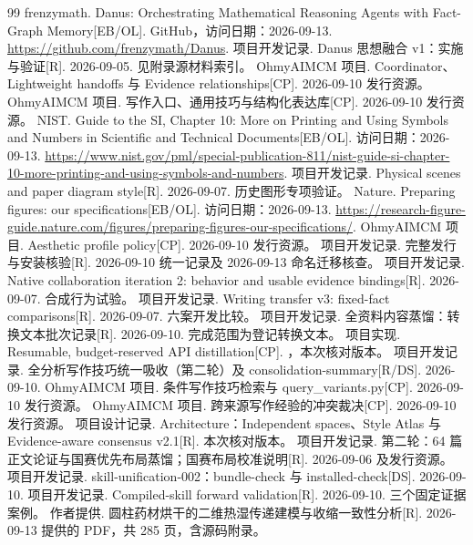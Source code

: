 \documentclass[UTF8,a4paper,zihao=-4,fontset=fandol]{ctexart}
\begin{document}
\begin{thebibliography}{99}\small
{} frenzymath. Danus: Orchestrating Mathematical Reasoning Agents with Fact-Graph Memory[EB/OL]. GitHub，访问日期：2026-09-13. \url{https://github.com/frenzymath/Danus}.
 项目开发记录. Danus 思想融合 v1：实施与验证[R]. 2026-09-05. 见附录源材料索引。
 OhmyAIMCM 项目. Coordinator、Lightweight handoffs 与 Evidence relationships[CP]. 2026-09-10 发行资源。
 OhmyAIMCM 项目. 写作入口、通用技巧与结构化表达库[CP]. 2026-09-10 发行资源。
 NIST. Guide to the SI, Chapter 10: More on Printing and Using Symbols and Numbers in Scientific and Technical Documents[EB/OL]. 访问日期：2026-09-13. \url{https://www.nist.gov/pml/special-publication-811/nist-guide-si-chapter-10-more-printing-and-using-symbols-and-numbers}.
 项目开发记录. Physical scenes and paper diagram style[R]. 2026-09-07. 历史图形专项验证。
 Nature. Preparing figures: our specifications[EB/OL]. 访问日期：2026-09-13. \url{https://research-figure-guide.nature.com/figures/preparing-figures-our-specifications/}.
 OhmyAIMCM 项目. Aesthetic profile policy[CP]. 2026-09-10 发行资源。
 项目开发记录. 完整发行与安装核验[R]. 2026-09-10 统一记录及 2026-09-13 命名迁移核查。
 项目开发记录. Native collaboration iteration 2: behavior and usable evidence bindings[R]. 2026-09-07. 合成行为试验。
 项目开发记录. Writing transfer v3: fixed-fact comparisons[R]. 2026-09-07. 六案开发比较。
 项目开发记录. 全资料内容蒸馏：转换文本批次记录[R]. 2026-09-10. 完成范围为登记转换文本。
 项目实现. Resumable, budget-reserved API distillation[CP]. ，本次核对版本。
 项目开发记录. 全分析写作技巧统一吸收（第二轮）及 consolidation-summary[R/DS]. 2026-09-10.
 OhmyAIMCM 项目. 条件写作技巧检索与 query\_variants.py[CP]. 2026-09-10 发行资源。
 OhmyAIMCM 项目. 跨来源写作经验的冲突裁决[CP]. 2026-09-10 发行资源。
 项目设计记录. Architecture：Independent spaces、Style Atlas 与 Evidence-aware consensus v2.1[R]. 本次核对版本。
 项目开发记录. 第二轮：64 篇正文论证与国赛优先布局蒸馏；国赛布局校准说明[R]. 2026-09-06 及发行资源。
 项目开发记录. skill-unification-002：bundle-check 与 installed-check[DS]. 2026-09-10.
 项目开发记录. Compiled-skill forward validation[R]. 2026-09-10. 三个固定证据案例。
 作者提供. 圆柱药材烘干的二维热湿传递建模与收缩一致性分析[R]. 2026-09-13 提供的 PDF，共 285 页，含源码附录。
\end{thebibliography}
\end{document}
